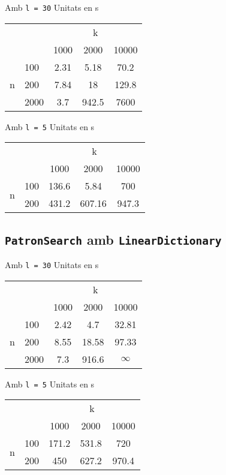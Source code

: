 \documentclass{article}
\begin{document}
Amb \verb|l = 30|
Unitats en s

\begin{tabular}{cl||c|c|c}
	\multicolumn{2}{c}{ } & \multicolumn{3}{c}{k} \\
	& & 1000 & 2000 & 10000 \\
	\cline{2-5}
	\multirow{3}{*}{n} 
	& 100 & 2.31 & 5.18 & 70.2 \\
	& 200 & 7.84 & 18 & 129.8 \\
	& 2000 & 3.7 & 942.5 & 7600 \\
\end{tabular}

Amb \verb|l = 5|
Unitats en s

\begin{tabular}{cl||c|c|c}
	\multicolumn{2}{c}{ } & \multicolumn{3}{c}{k} \\
	& & 1000 & 2000 & 10000 \\
	\cline{2-5}
	\multirow{2}{*}{n} 
	& 100 & 136.6 & 5.84 & 700 \\
	& 200 & 431.2 & 607.16 & 947.3 \\
\end{tabular}

\subsection{\texttt{PatronSearch} amb \texttt{LinearDictionary}}

Amb \verb|l = 30|
Unitats en s

\begin{tabular}{cl||c|c|c}
	\multicolumn{2}{c}{ } & \multicolumn{3}{c}{k} \\
	& & 1000 & 2000 & 10000 \\
	\cline{2-5}
	\multirow{3}{*}{n} 
	& 100 & 2.42 & 4.7 & 32.81 \\
	& 200 & 8.55 & 18.58 & 97.33 \\
	& 2000 & 7.3 & 916.6 & $\infty$ \\
\end{tabular}

Amb \verb|l = 5|
Unitats en s

\begin{tabular}{cl||c|c|c}
	\multicolumn{2}{c}{ } & \multicolumn{3}{c}{k} \\
	& & 1000 & 2000 & 10000 \\
	\cline{2-5}
	\multirow{2}{*}{n} 
	& 100 & 171.2 & 531.8 & 720 \\
	& 200 & 450 & 627.2 & 970.4 \\
\end{tabular}
\end{document}
